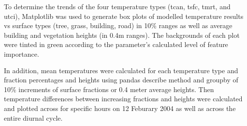 \documentclass[final,3p,times,authoryear]{elsarticle}
\begin{document}
%

To determine the trends of the four temperature types (\gls{tcan}, \gls{tsfc}, \gls{tmrt}, and \gls{utci}), Matplotlib \citep{Hunter2007} was used to generate box plots of modelled temperature results vs surface types (tree, grass, building, road) in 10\% ranges as well as average building and vegetation heights (in 0.4m ranges). The backgrounds of each plot were tinted in green according to the parameter's calculated level of feature importance.


In addition, mean temperatures were calculated for each temperature type and fraction percentages and heights using pandas \citep{reback2020pandas} describe method and groupby of 10\% increments of surface fractions or 0.4 meter average heights. Then temperature differences between increasing fractions and heights were calculated and plotted across for specific hours on 12 Feburary 2004 as well as across the entire diurnal cycle.
\end{document}
